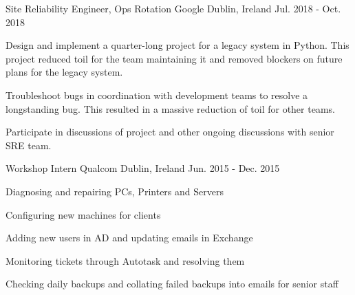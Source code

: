 \begin{cventries}
  \cventry
    {Site Reliability Engineer, Ops Rotation} %
    {Google} %
    {Dublin, Ireland} %
    {Jul. 2018 - Oct. 2018} %
    {
      \begin{cvitems} %
        \item {Design and implement a quarter-long project for a legacy system in Python. This project reduced toil for the team maintaining it and removed blockers on future plans for the legacy system.}
        \item {Troubleshoot bugs in coordination with development teams to resolve a longstanding bug. This resulted in a massive reduction of toil for other teams.}
        \item {Participate in discussions of project and other ongoing discussions with senior SRE team.}
      \end{cvitems}
    }

  \cventry
    {Workshop Intern} %
    {Qualcom} %
    {Dublin, Ireland} %
    {Jun. 2015 - Dec. 2015} %
    {
      \begin{cvitems} %
        \item {Diagnosing and repairing PCs, Printers and Servers}
        \item {Configuring new machines for clients}
        \item {Adding new users in AD and updating emails in Exchange}
        \item {Monitoring tickets through Autotask and resolving them}
        \item {Checking daily backups and collating failed backups into emails for senior staff}
      \end{cvitems}
    }
\end{cventries}

